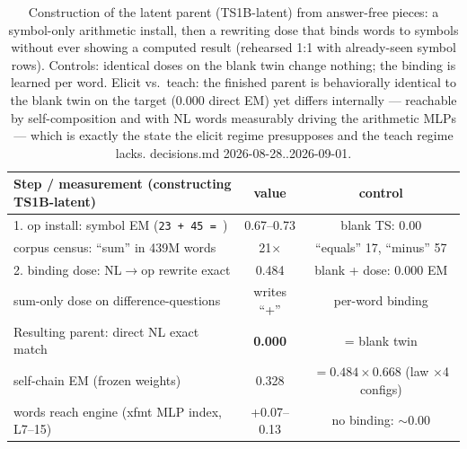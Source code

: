 \begin{table}[t]
\centering
\begin{tabular}{lcc}
\hline
Step / measurement (constructing TS1B-latent) & value & control \\
\hline
1. op install: symbol EM (\texttt{23 + 45 = }) & 0.67--0.73 & blank TS: 0.00 \\
\quad corpus census: ``sum'' in 439M words & 21$\times$ & ``equals'' 17, ``minus'' 57 \\
2. binding dose: NL$\to$op rewrite exact & 0.484 & blank + dose: 0.000 EM \\
\quad sum-only dose on difference-questions & writes ``+'' & per-word binding \\
Resulting parent: direct NL exact match & \textbf{0.000} & = blank twin \\
\quad self-chain EM (frozen weights) & 0.328 & $=0.484\times0.668$ (law $\times$4 configs) \\
\quad words reach engine (xfmt MLP index, L7--15) & +0.07--0.13 & no binding: $\sim$0.00 \\
\hline
\end{tabular}
\caption{Construction of the latent parent (TS1B-latent) from answer-free pieces: a symbol-only arithmetic install, then a rewriting dose that binds words to symbols without ever showing a computed result (rehearsed 1:1 with already-seen symbol rows). Controls: identical doses on the blank twin change nothing; the binding is learned per word. Elicit vs.\ teach: the finished parent is behaviorally identical to the blank twin on the target (0.000 direct EM) yet differs internally --- reachable by self-composition and with NL words measurably driving the arithmetic MLPs --- which is exactly the state the elicit regime presupposes and the teach regime lacks. decisions.md 2026-08-28..2026-09-01.}
\label{tab:premise_program}
\end{table}
